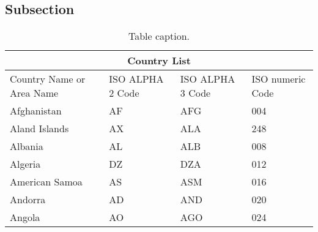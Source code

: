 \subsection{Subsection} \label{sec:subsection2}

\lipsum[9-10]

\begin{table}
  \centering
  \begin{tabular}{|p{3cm}||p{3cm}|p{3cm}|p{3cm}|}
  \hline
  \multicolumn{4}{|c|}{Country List} \\
  \hline
  Country Name     or Area Name& ISO ALPHA 2 Code &ISO ALPHA 3 Code&ISO numeric Code\\
  \hline
  Afghanistan   & AF    &AFG&   004\\
  Aland Islands&   AX  & ALA   &248\\
  Albania &AL & ALB&  008\\
  Algeria    &DZ & DZA&  012\\
  American Samoa&   AS  & ASM&016\\
  Andorra& AD  & AND   &020\\
  Angola& AO  & AGO&024\\
  \hline
  \end{tabular}
  \caption{Table caption.}
  \label{tab:test}
\end{table}

\lipsum[11-12]
